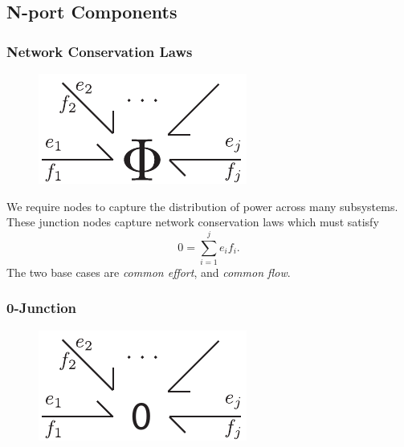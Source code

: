 \documentclass[11pt,reqno]{beamer}
\begin{document}
\subsection{N-port Components}
\begin{frame}
\frametitle{Network Conservation Laws}
\begin{figure}
	\includegraphics{images/nport.pdf}
\end{figure}
We require nodes to capture the distribution of power across many subsystems. These junction nodes capture network conservation laws which must satisfy
\[
0 = \sum_{i=1}^j e_if_i.
\]
The two base cases are \emph{common effort}, and \emph{common flow}.
\end{frame}
\begin{frame}
\frametitle{0-Junction}
\begin{figure}
	\includegraphics{images/nport-0.pdf}
\end{figure}
\end{frame}
\end{document}
